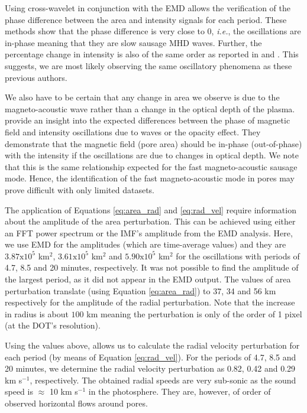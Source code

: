     Using cross-wavelet in conjunction with the EMD allows the verification of the phase difference between the area and intensity signals for each period. 
    These methods show that the phase difference is very close to 0\degree, \textit{i.e.}, the oscillations are in-phase meaning that they are slow sausage MHD waves.	
    Further, the percentage change in intensity is also of the same order as reported in \citet{Balthasar2000} and \citet{PMHDW}.
    This suggests, we are most likely observing the same oscillatory phenomena as these previous authors.
    
    We also have to be certain that any change in area we observe is due to the magneto-acoustic wave rather than a change in the optical depth of the plasma.
    \citet{PMHDW} provide an insight into the expected differences between the phase of magnetic field and intensity oscillations due to waves or the opacity effect.
    They demonstrate that the magnetic field (pore area) should be in-phase (out-of-phase) with the intensity if the oscillations are due to changes in optical depth.
    We note that this is the same relationship expected for the fast magneto-acoustic sausage mode.
    Hence, the identification of the fast magneto-acoustic mode in pores may prove difficult with only limited datasets.
    
    The application of Equations \ref{eq:area_rad} and \ref{eq:rad_vel} require information about the amplitude of the area perturbation.
    This can be achieved using either an FFT power spectrum or the IMF's amplitude from the EMD analysis.
    Here, we use EMD for the amplitudes (which are time-average values) and they are $3.87\mathrm{x}10^5$ km$^2$, $3.61\mathrm{x}10^5$ km$^2$ and $5.90\mathrm{x}10^5$ km$^2$ for the oscillations with periods of 4.7, 8.5 and 20 minutes, respectively.
    It was not possible to find the amplitude of the largest period, as it did not appear in the EMD output.
    The values of area perturbation translate (using Equation \ref{eq:area_rad}) to 37, 34 and 56 km respectively for the amplitude of the radial perturbation.
    Note that the increase in radius is about $100$ km meaning the perturbation is only of the order of 1 pixel (at the DOT's resolution).
    
    Using the values above, allows us to calculate the radial velocity perturbation for each period (by means of Equation \ref{eq:rad_vel}).
    For the periods of 4.7, 8.5 and 20 minutes, we determine the radial velocity perturbation as 0.82, 0.42 and 0.29 km s$^{-1}$, respectively.
    The obtained radial speeds are very sub-sonic as the sound speed is $\approx$ 10 km s$^{-1}$ in the photosphere.
    They are, however, of order of observed horizontal flows around pores.
    
